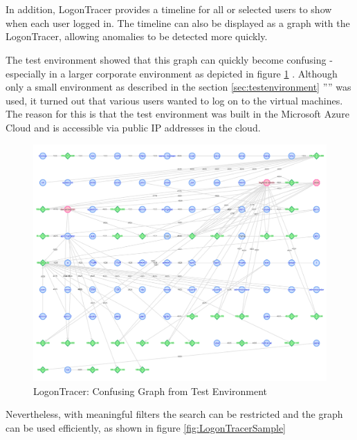 \\\\
In addition, LogonTracer provides a timeline for all or selected users to show when each user logged in. The timeline can also be displayed as a graph with the LogonTracer, allowing anomalies to be detected more quickly.

\clearpage

The test environment showed that this graph can quickly become confusing - especially in a larger corporate environment as depicted in figure \ref{fig:LogonTraceerConfusing} . Although only a small environment as described in the section \ref{sec:testenvironment} '''' was used, it turned out that various users wanted to log on to the virtual machines. The reason for this is that the test environment was built in the Microsoft Azure Cloud and is accessible via public IP addresses in the cloud.

\begin{figure}[H]
    \centering
    \includegraphics[width=0.8\linewidth]{assets/LogonTracer/logontracer_confusing.png}
    \caption{LogonTracer: Confusing Graph from Test Environment}
    \label{fig:LogonTraceerConfusing}
\end{figure}

Nevertheless, with meaningful filters the search can be restricted and the graph can be used efficiently, as shown in figure \ref{fig:LogonTracerSample} 

\clearpage

